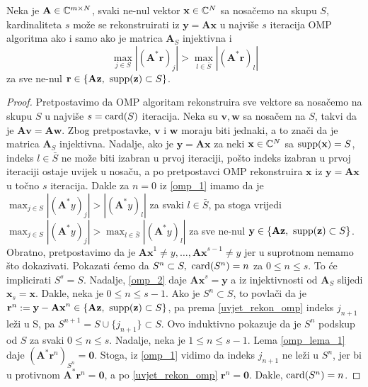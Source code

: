 \documentclass[a4paper,twoside,12pt]{memoir} %
\newcommand{\vect}[1]{\mathbf{#1}}
\renewcommand{\vec}{\vect}
\newcommand{\card}{\text{\normalfont{card}}}
\newcommand{\supp}{\text{\normalfont{supp}}}
\begin{document}
\begin{prop}
    Neka je $\vec A \in \C^{m \times N}$, svaki ne-nul vektor $\vec x \in \C^N$ sa nosa\v{c}emo na skupu $S$, kardinaliteta $s$ mo\v{z}e se rekonstruirati iz $\vec y = \vec{Ax}$ u najvi\v{s}e $s$ iteracija OMP algoritma ako i samo ako je matrica $\vec A_S$ injektivna i 
    \begin{equation}\label{uvjet_rekon_omp}
        \max_{j \in S}|(\vec A^* \vec r)_j| > \max_{l \in \bar{S}}|(\vec A^* \vec r)_l|
    \end{equation}
    za sve ne-nul $\vec r \in \{\vec{Az},\ \supp(\vec z) \subset S\}$.
\end{prop}
\begin{proof}
    Pretpostavimo da OMP algoritam rekonstruira sve vektore sa nosa\v{c}emo na skupu $S$ u najvi\v{s}e $s = \card(S)$ iteracija. Neka su $\vec v, \vec w$ sa nosa\v{c}em na $S$, takvi da je $\vec{Av}=\vec{Aw}$. Zbog pretpostavke, $\vec v$ i $\vec w$ moraju biti jednaki, a to zna\v{c}i da je matrica $\vec A_S$ injektivna. Nadalje, ako je $\vec y = \vec{Ax}$ za neki $\vec x \in \C^N$ sa $\supp(\vec x)=S$, indeks $l \in \bar S$ ne mo\v{z}e biti izabran u prvoj iteraciji, po\v{s}to indeks izabran u prvoj iteraciji ostaje uvijek u nosa\v{c}u, a po pretpostavci OMP rekonstruira $\vec x$ iz $\vec y = \vec{Ax}$ u to\v{c}no $s$ iteracija. Dakle za $n=0$ iz \eqref{omp_1} imamo da je $\max_{j \in S}|(\vec A^*y)_j| > |(\vec A^*y)_l|$ za svaki $l \in \bar{S}$, pa stoga vrijedi $\max_{j \in S}|(\vec A^*y)_j| > \max_{l \in \bar{S}}|(\vec A^*y)_l|$ za sve ne-nul $\vec y \in \{\vec{Az},\ \supp(\vec z) \subset S\}$. \\
    \indent
    Obratno, pretpostavimo da je $\vec{Ax}^1 \neq y,\dots,\vec{Ax}^{s-1} \neq y$ jer u suprotnom nemamo \v{s}to dokazivati. Pokazati \'cemo da $S^n \subset S,\ \card(S^n)=n$ za $0 \leq n \leq s$. To \'ce implicirati $S^s = S$. Nadalje, \eqref{omp_2} daje $\vec{Ax}^s = \vec y$ a iz injektivnosti od $\vec{A}_S$ slijedi $\vec x_s = \vec{x}$. Dakle, neka je $0 \leq n \leq s-1$. Ako je $S^n \subset S$, to povla\v{c}i da je $\vec r^n := \vec y - \vec{Ax}^n \in \{\vec{Az},\ \supp(\vec z) \subset S\}$, pa prema \eqref{uvjet_rekon_omp} indeks $j_{n+1}$ le\v{z}i u S, pa $S^{n+1} = S \cup \{j_{n+1}\} \subset S$. Ovo induktivno pokazuje da je $S^n$ podskup od $S$ za svaki $0 \leq n \leq s$. Nadalje, neka je $1 \leq n \leq s-1$. Lema \eqref{omp_lema_1} daje $(\vec{A}^* \vec r^n)_{S^n} = \vec 0$. Stoga, iz \eqref{omp_1} vidimo da indeks $j_{n+1}$ ne le\v{z}i u $S^{n}$, jer bi u protivnom $\vec A^* \vec r^n = \vec 0$, a po \eqref{uvjet_rekon_omp} $\vec r^n = \vec 0$. Dakle, $\card(S^n)=n$.
\end{proof}
\end{document}
